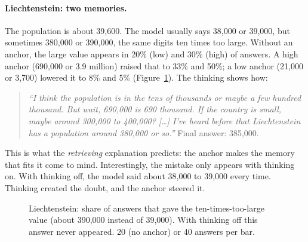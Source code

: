 \documentclass[11pt,a4paper]{article}
\newcommand{\quoteit}[1]{\emph{\enquote{#1}}}
\begin{document}
\paragraph{Liechtenstein: two memories.} The population is about 39,600. The model usually says 38,000 or 39,000, but sometimes 380,000 or 390,000, the same digits ten times too large. Without an anchor, the large value appears in 20\% (low) and 30\% (high) of answers. A high anchor (690,000 or 3.9 million) raised that to 33\% and 50\%; a low anchor (21,000 or 3,700) lowered it to 8\% and 5\% (Figure~\ref{fig:liech}). The thinking shows how:

\begin{quote}\small
\quoteit{I think the population is in the tens of thousands or maybe a few hundred thousand. But wait, 690,000 is 690 thousand. If the country is small, maybe around 300,000 to 400,000? [\dots] I've heard before that Liechtenstein has a population around 380,000 or so.} Final answer: 385,000.
\end{quote}

\noindent This is what the \emph{retrieving} explanation predicts: the anchor makes the memory that fits it come to mind. Interestingly, the mistake only appears with thinking on. With thinking off, the model said about 38,000 to 39,000 every time. Thinking created the doubt, and the anchor steered it.

\begin{figure}[ht]
\centering
{}
\caption{Liechtenstein: share of answers that gave the ten-times-too-large value (about 390,000 instead of 39,000). With thinking off this answer never appeared. 20 (no anchor) or 40 answers per bar.}
\label{fig:liech}
\end{figure}
\end{document}
